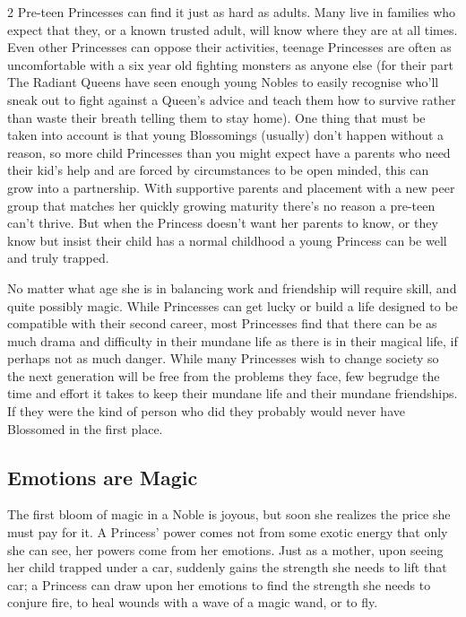\begin{multicols}{2}
Pre-teen Princesses can find it just as hard as adults. Many live in families who expect that they, or a known trusted adult, will know where they are at all times. Even other Princesses can oppose their activities, teenage Princesses are often as uncomfortable with a six year old fighting monsters as anyone else (for their part The Radiant Queens have seen enough young Nobles to easily recognise who'll sneak out to fight against a Queen's advice and teach them how to survive rather than waste their breath telling them to stay home). One thing that must be taken into account is that young Blossomings (usually) don't happen without a reason, so more child Princesses than you might expect have a parents who need their kid's help and are forced by circumstances to be open minded, this can grow into a partnership. With supportive parents and placement with a new peer group that matches her quickly growing maturity there's no reason a pre-teen can't thrive. But when the Princess doesn't want her parents to know, or they know but insist their child has a normal childhood a young Princess can be well and truly trapped.

No matter what age she is in balancing work and friendship will require skill, and quite possibly magic. While Princesses can get lucky or build a life designed to be compatible with their second career, most Princesses find that there can be as much drama and difficulty in their mundane life as there is in their magical life, if perhaps not as much danger. While many Princesses wish to change society so the next generation will be free from the problems they face, few begrudge the time and effort it takes to keep their mundane life and their mundane friendships. If they were the kind of person who did they probably would never have Blossomed in the first place. 

\subsection*{Emotions are Magic}

The first bloom of magic in a Noble is joyous, but soon she realizes the price she must pay for it. A Princess' power comes not from some exotic energy that only she can see, her powers come from her emotions. Just as a mother, upon seeing her child trapped under a car, suddenly gains the strength she needs to lift that car; a Princess can draw upon her emotions to find the strength she needs to conjure fire, to heal wounds with a wave of a magic wand, or to fly. 


\end{multicols}
